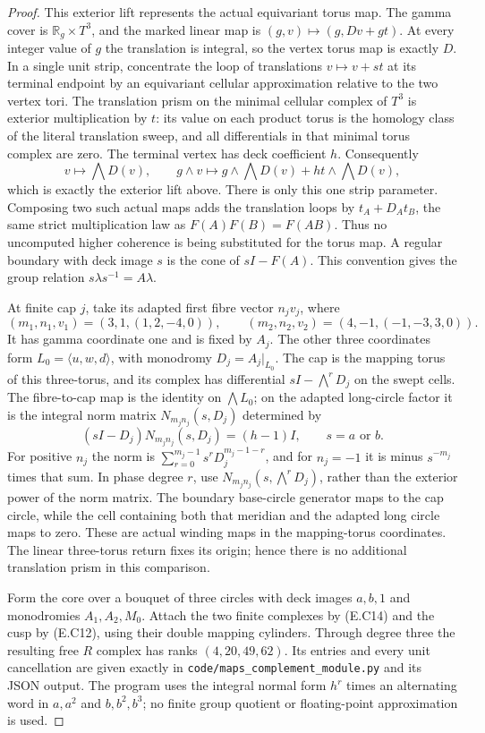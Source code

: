 \begin{proof}
This exterior lift represents the actual equivariant
torus map. The gamma cover is
$\mathbb R_g\times T^3$, and the marked linear map is
$(g,v)\mapsto(g,Dv+gt)$. At every integer value of $g$
the translation is integral, so the vertex torus map
is exactly $D$. In a single unit strip, concentrate
the loop of translations $v\mapsto v+st$ at its
terminal endpoint by an equivariant cellular
approximation relative to the two vertex tori.
The translation prism on the minimal cellular complex
of $T^3$ is exterior multiplication by $t$: its value
on each product torus is the homology class of the
literal translation sweep, and all differentials
in that minimal torus complex are zero. The terminal
vertex has deck coefficient $h$. Consequently
\[
 v\longmapsto\bigwedge D(v),\qquad
 g\wedge v\longmapsto
 g\wedge\bigwedge D(v)+ht\wedge\bigwedge D(v),
 \tag{E.C20}
\]
which is exactly the exterior lift above. There is
only this one strip parameter. Composing two such
actual maps adds the translation loops by
$t_A+D_At_B$, the same strict multiplication law
as $F(A)F(B)=F(AB)$. Thus no uncomputed higher
coherence is being substituted for the torus map.
A regular
boundary with deck image $s$ is the cone of $sI-F(A)$.
This convention gives the group relation
$s\lambda s^{-1}=A\lambda$.

At finite cap $j$, take its adapted first fibre vector
$n_jv_j$, where
\[
 (m_1,n_1,v_1)=(3,1,(1,2,-4,0)),\qquad
 (m_2,n_2,v_2)=(4,-1,(-1,-3,3,0)).
 \tag{E.C13}
\]
It has gamma coordinate one and is fixed by $A_j$.
The other three coordinates form $L_0=\langle u,w,d\rangle$,
with monodromy $D_j=A_j|_{L_0}$. The cap is the
mapping torus of this three-torus, and its complex has
differential $sI-\bigwedge^rD_j$ on the swept cells.
The fibre-to-cap map is the identity on $\bigwedge L_0$;
on the adapted long-circle factor it is the integral
norm matrix $N_{m_jn_j}(s,D_j)$ determined by
\[
 (sI-D_j)N_{m_jn_j}(s,D_j)=(h-1)I,
 \qquad s=a\text{ or }b.
 \tag{E.C14}
\]
For positive $n_j$ the norm is
$\sum_{r=0}^{m_j-1}s^rD_j^{m_j-1-r}$, and for
$n_j=-1$ it is minus $s^{-m_j}$ times that sum.
In phase degree $r$, use
$N_{m_jn_j}(s,\bigwedge^rD_j)$, rather than the
exterior power of the norm matrix.
The boundary base-circle generator maps to the cap circle, while
the cell containing both that meridian and the adapted
long circle maps to zero. These are actual winding
maps in the mapping-torus coordinates. The linear
three-torus return fixes its origin; hence there is
no additional translation prism in this comparison.

Form the core over a bouquet of three circles with
deck images $a,b,1$ and monodromies $A_1,A_2,M_0$.
Attach the two finite complexes by (E.C14) and the
cusp by (E.C12), using their double mapping cylinders.
Through degree three the resulting free $R$ complex
has ranks $(4,20,49,62)$. Its entries and every unit
cancellation are given exactly in
\texttt{code/maps\_complement\_module.py} and its
JSON output. The program uses the integral normal
form $h^r$ times an alternating word in
$a,a^2$ and $b,b^2,b^3$; no finite group quotient or
floating-point approximation is used.


\end{proof}
